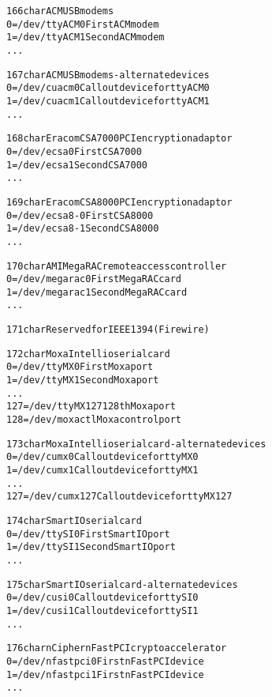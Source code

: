 \documentclass[a4paper,8pt,english]{sphinxmanual}
\begin{document}
\begin{alltt}
 166 char       ACM USB modems
                  0 = /dev/ttyACM0      First ACM modem
                  1 = /dev/ttyACM1      Second ACM modem
                    ...

 167 char       ACM USB modems - alternate devices
                  0 = /dev/cuacm0       Callout device for ttyACM0
                  1 = /dev/cuacm1       Callout device for ttyACM1
                    ...

 168 char       Eracom CSA7000 PCI encryption adaptor
                  0 = /dev/ecsa0        First CSA7000
                  1 = /dev/ecsa1        Second CSA7000
                    ...

 169 char       Eracom CSA8000 PCI encryption adaptor
                  0 = /dev/ecsa8-0      First CSA8000
                  1 = /dev/ecsa8-1      Second CSA8000
                    ...

 170 char       AMI MegaRAC remote access controller
                  0 = /dev/megarac0     First MegaRAC card
                  1 = /dev/megarac1     Second MegaRAC card
                    ...

 171 char       Reserved for IEEE 1394 (Firewire)

 172 char       Moxa Intellio serial card
                  0 = /dev/ttyMX0       First Moxa port
                  1 = /dev/ttyMX1       Second Moxa port
                    ...
                127 = /dev/ttyMX127     128th Moxa port
                128 = /dev/moxactl      Moxa control port

 173 char       Moxa Intellio serial card - alternate devices
                  0 = /dev/cumx0        Callout device for ttyMX0
                  1 = /dev/cumx1        Callout device for ttyMX1
                    ...
                127 = /dev/cumx127      Callout device for ttyMX127

 174 char       SmartIO serial card
                  0 = /dev/ttySI0       First SmartIO port
                  1 = /dev/ttySI1       Second SmartIO port
                    ...

 175 char       SmartIO serial card - alternate devices
                  0 = /dev/cusi0        Callout device for ttySI0
                  1 = /dev/cusi1        Callout device for ttySI1
                    ...

 176 char       nCipher nFast PCI crypto accelerator
                  0 = /dev/nfastpci0    First nFast PCI device
                  1 = /dev/nfastpci1    First nFast PCI device
                    ...


\end{alltt}
\end{document}
